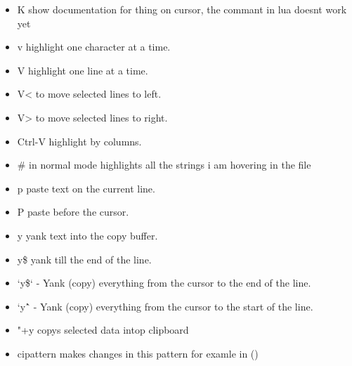 \documentclass[12pt]{article}
\begin{document}
\begin{itemize}
    \item K show documentation for thing on cursor, the commant in lua doesnt work yet 
    \item v highlight one character at a time.
    \item V highlight one line at a time.
    \item V< to move selected lines to left.
    \item V> to move selected lines to right.
    \item Ctrl-V highlight by columns.
    \item \# in normal mode highlights all the strings i am hovering in the file 
    \item p paste text on the current line.
    \item P paste before the cursor.
    \item y yank text into the copy buffer.
    \item y\$ yank till the end of the line.
    \item `y\$` - Yank (copy) everything from the cursor to the end of the line.
    \item `y\^` - Yank (copy) everything from the cursor to the start of the line.
    \item "+y copys selected data intop clipboard 
    \item cipattern makes changes in this pattern for examle in ()
\end{itemize}
\end{document}
